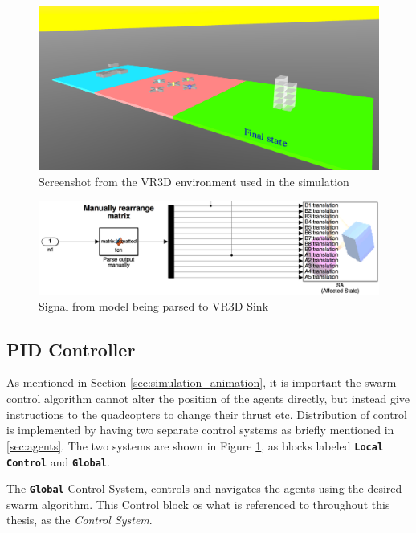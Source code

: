 \begin{figure}[H]
	\centering
	\includegraphics[width=1\columnwidth]{figures/3d_platform}
  	\caption{\label{fig:3d_overview}Screenshot from the VR3D environment used in the simulation}
\end{figure}

\begin{figure}[H]
	\centering
	\includegraphics[width=1\columnwidth]{figures/3d_sink}
  	\caption{\label{fig:3d_sink}Signal from model being parsed to VR3D Sink}
\end{figure}



\subsection{PID Controller}
\label{sec:sim_pid}

As mentioned in Section \ref{sec:simulation_animation}, it is important the swarm control algorithm cannot alter the position of the agents directly, but instead give instructions to the quadcopters to change their thrust etc. Distribution of control is implemented by having two separate control systems as briefly mentioned in \ref{sec:agents}. The two systems are shown in Figure \ref{fig:3d_overview}, as blocks labeled \textbf{\texttt{Local Control}} and \textbf{\texttt{Global}}. 

The \textbf{\texttt{Global}} Control System, controls and navigates the agents using the desired swarm algorithm. This Control block os what is referenced to throughout this thesis, as the \textit{Control System}. 

